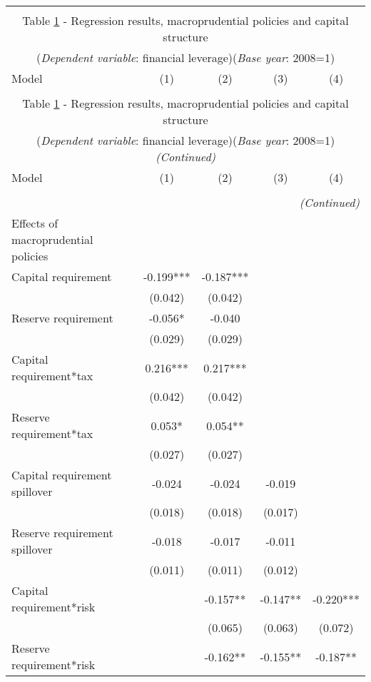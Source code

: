 \begin{longtable}{lcccc}\\
	\label{reg:base_year}\\
	\multicolumn{5}{c}{Table \ref{reg:base_year} - Regression results, macroprudential policies and capital structure }\\
	\multicolumn{5}{c}{(\textit{Dependent variable}: financial leverage)(\textit{Base year}: 2008=1)}
	\\ \hline \hline
	Model & (1) & (2) & (3) & (4)  \\ \hline
	&  &  &  \\ \endfirsthead
	\multicolumn{5}{c}{Table \ref{reg:base_year} - Regression results, macroprudential policies and capital structure }\\
	\multicolumn{5}{c}{(\textit{Dependent variable}: financial leverage)(\textit{Base year}: 2008=1)\textit{(Continued)}}
	\\ \hline \hline
	Model & (1) & (2) & (3) & (4)  \\ \hline 
	&  &  &  & \\ \endhead
	\hline
	\multicolumn{5}{r}{{\textit{(Continued)}}}\\ \endfoot	
	\endlastfoot
	Effects of macroprudential policies  &  &  &  \\
\quad Capital requirement & -0.199*** & -0.187*** &  &  \\
 & (0.042) & (0.042) &  &  \\
\quad Reserve requirement & -0.056* & -0.040 &  &  \\
 & (0.029) & (0.029) &  &  \\
\quad Capital requirement*tax & 0.216*** & 0.217*** &  &  \\
 & (0.042) & (0.042) &  &  \\
\quad Reserve requirement*tax & 0.053* & 0.054** &  &  \\
 & (0.027) & (0.027) &  &  \\
\quad Capital requirement spillover & -0.024 & -0.024 & -0.019 &  \\
 & (0.018) & (0.018) & (0.017) &  \\
\quad Reserve requirement spillover & -0.018 & -0.017 & -0.011 &  \\
 & (0.011) & (0.011) & (0.012) &  \\
\quad Capital requirement*risk &  & -0.157** & -0.147** & -0.220*** \\
 &  & (0.065) & (0.063) & (0.072) \\
\quad Reserve requirement*risk &  & -0.162** & -0.155** & -0.187** \\

\end{longtable}
